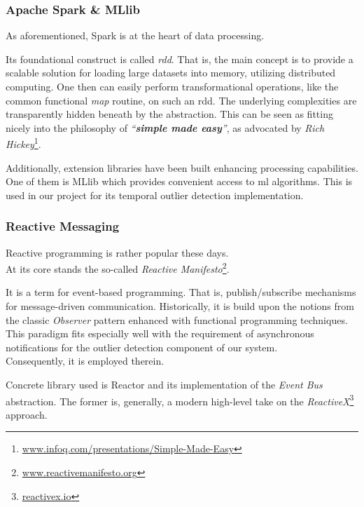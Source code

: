 \subsubsection{Apache Spark \& MLlib}

As aforementioned, Spark is at the heart of data processing.

Its foundational construct is called \emph{\gls{rdd}}.
That is, the main concept is to provide a scalable solution for loading large datasets into memory, utilizing distributed computing.
One then can easily perform transformational operations, like the common functional \emph{map} routine, on such an \gls{rdd}.
The underlying complexities are transparently hidden beneath by the abstraction.
This can be seen as fitting nicely into the philosophy of \emph{``\textbf{simple made easy}''}, as advocated by \emph{Rich Hickey}\footnote{\textcolor{blue}{\href{https://www.infoq.com/presentations/Simple-Made-Easy}{www.infoq.com/presentations/Simple-Made-Easy}}}.

Additionally, extension libraries have been built enhancing processing capabilities.
One of them is MLlib which provides convenient access to \gls{ml} algorithms.
This is used in our project for its temporal outlier detection implementation.

\subsubsection{Reactive Messaging}

Reactive programming is rather popular these days. \\
At its core stands the so-called \emph{Reactive Manifesto}\footnote{\textcolor{blue}{\href{http://www.reactivemanifesto.org/}{www.reactivemanifesto.org}}}.

It is a term for event-based programming.
That is, publish/subscribe mechanisms for message-driven communication.
Historically, it is build upon the notions from the classic \emph{Observer} pattern enhanced with functional programming techniques.
This paradigm fits especially well with the requirement of asynchronous notifications for the outlier detection component of our system. \\
Consequently, it is employed therein.

Concrete library used is Reactor and its implementation of the \emph{Event Bus} abstraction.
The former is, generally, a modern high-level take on the \emph{ReactiveX}\footnote{\textcolor{blue}{\href{http://reactivex.io/}{reactivex.io}}} approach.


